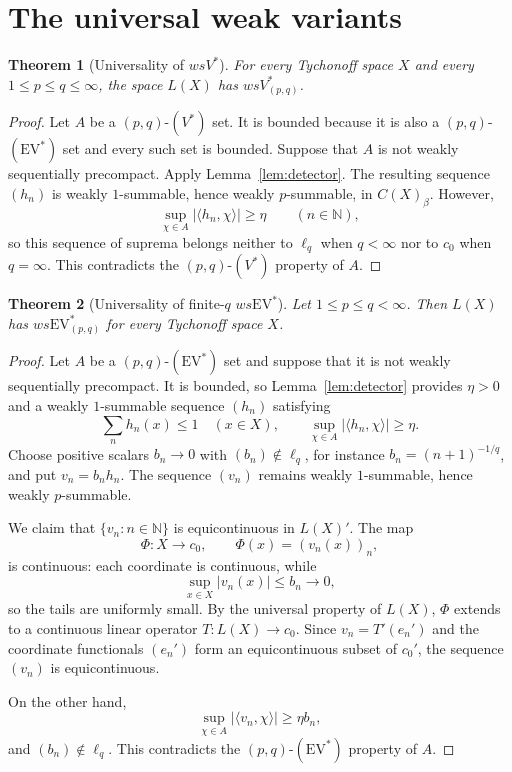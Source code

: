 \documentclass[11pt]{article}
\newtheorem{theorem}{Theorem}[section]
\newcommand{\N}{\mathbb N}
\newcommand{\EV}{\mathrm{EV}}
\begin{document}
\section{The universal weak variants}

\begin{theorem}[Universality of $wsV^*$]\label{thm:wsv}
For every Tychonoff space $X$ and every $1\leq p\leq q\leq\infty$, the space
$L(X)$ has $wsV^*_{(p,q)}$.
\end{theorem}

\begin{proof}
Let $A$ be a $(p,q)$-$(V^*)$ set.  It is bounded because it is also a
$(p,q)$-$(\EV^*)$ set and every such set is bounded.  Suppose that $A$ is not
weakly sequentially precompact.  Apply Lemma~\ref{lem:detector}.  The resulting
sequence $(h_n)$ is weakly $1$-summable, hence weakly $p$-summable, in
$C(X)_\beta$.  However,
\[
  \sup_{\chi\in A}|\langle h_n,\chi\rangle|\geq\eta
  \qquad(n\in\N),
\]
so this sequence of suprema belongs neither to $\ell_q$ when $q<\infty$ nor to
$c_0$ when $q=\infty$.  This contradicts the $(p,q)$-$(V^*)$ property of $A$.
\end{proof}

\begin{theorem}[Universality of finite-$q$ $ws\EV^*$]\label{thm:wsevfinite}
Let $1\leq p\leq q<\infty$.  Then $L(X)$ has $ws\EV^*_{(p,q)}$ for every
Tychonoff space $X$.
\end{theorem}

\begin{proof}
Let $A$ be a $(p,q)$-$(\EV^*)$ set and suppose that it is not weakly
sequentially precompact.  It is bounded, so Lemma~\ref{lem:detector} provides
$\eta>0$ and a weakly $1$-summable sequence $(h_n)$ satisfying
\[
  \sum_nh_n(x)\leq1
  \quad(x\in X),
  \qquad
  \sup_{\chi\in A}|\langle h_n,\chi\rangle|\geq\eta.
\]
Choose positive scalars $b_n\to0$ with $(b_n)\notin\ell_q$, for instance
$b_n=(n+1)^{-1/q}$, and put $v_n=b_nh_n$.  The sequence $(v_n)$ remains weakly
$1$-summable, hence weakly $p$-summable.

We claim that $\{v_n:n\in\N\}$ is equicontinuous in $L(X)'$.  The map
\[
  \Phi:X\longrightarrow c_0,
  \qquad
  \Phi(x)=(v_n(x))_n,
\]
is continuous: each coordinate is continuous, while
\[
  \sup_{x\in X}|v_n(x)|\leq b_n\longrightarrow0,
\]
so the tails are uniformly small.  By the universal property of $L(X)$,
$\Phi$ extends to a continuous linear operator $T:L(X)\to c_0$.  Since
$v_n=T'(e_n')$ and the coordinate functionals $(e_n')$ form an equicontinuous
subset of $c_0'$, the sequence $(v_n)$ is equicontinuous.

On the other hand,
\[
  \sup_{\chi\in A}|\langle v_n,\chi\rangle|
  \geq\eta b_n,
\]
and $(b_n)\notin\ell_q$.  This contradicts the $(p,q)$-$(\EV^*)$ property of
$A$.
\end{proof}
\end{document}
